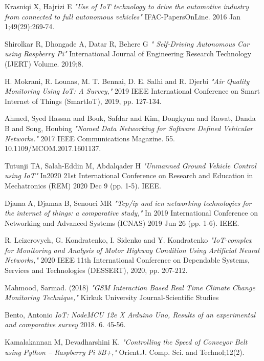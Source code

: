 \documentclass[conference,a4paper]{IEEEtran}
\begin{document}
\begin{thebibliography}{}

Krasniqi X, Hajrizi E
\textit {"Use of IoT technology to drive the automotive industry from connected to full autonomous vehicles"} IFAC-PapersOnLine. 2016 Jan 1;49(29):269-74.

Shirolkar R, Dhongade A, Datar R, Behere G
\textit{" Self-Driving Autonomous Car using Raspberry Pi"}
International Journal of Engineering Research Technology (IJERT) Volume. 2019;8.

H. Mokrani, R. Lounas, M. T. Bennai, D. E. Salhi and R. Djerbi
\textit{"Air Quality Monitoring Using IoT: A Survey,"} 
2019 IEEE International Conference on Smart Internet of Things (SmartIoT), 2019, pp. 127-134.


Ahmed, Syed Hassan and Bouk, Safdar and Kim, Dongkyun and Rawat, Danda B and Song, Houbing
\textit{"Named Data Networking for Software Defined Vehicular Networks."}
2017 IEEE Communications Magazine. 55. 10.1109/MCOM.2017.1601137. 

Tutunji TA, Salah-Eddin M, Abdalqader H
\textit {"Unmanned Ground Vehicle Control using IoT"} In2020 21st International Conference on Research and Education in Mechatronics (REM) 2020 Dec 9 (pp. 1-5). IEEE.

Djama A, Djamaa B, Senouci MR
\textit{"Tcp/ip and icn networking technologies for the internet of things: a comparative study,"}
In 2019 International Conference on Networking and Advanced Systems (ICNAS) 2019 Jun 26 (pp. 1-6). IEEE.

R. Leizerovych, G. Kondratenko, I. Sidenko and Y. Kondratenko
\textit{"IoT-complex for Monitoring and Analysis of Motor Highway Condition Using Artificial Neural Networks,"}
2020 IEEE 11th International Conference on Dependable Systems, Services and Technologies (DESSERT), 2020, pp. 207-212.

Mahmood, Sarmad. (2018)
\textit{"GSM Interaction Based Real Time Climate Change Monitoring Technique,"}
Kirkuk University Journal-Scientific Studies

Bento, Antonio
\textit{IoT: NodeMCU 12e X Arduino Uno, Results of an experimental and comparative survey} 
2018. 6. 45-56. 

Kamalakannan M, Devadharshini K. 
\textit{"Controlling the Speed of Conveyor Belt using Python – Raspberry Pi 3B+,"}
Orient.J. Comp. Sci. and Technol;12(2).


\end{thebibliography}
\end{document}
